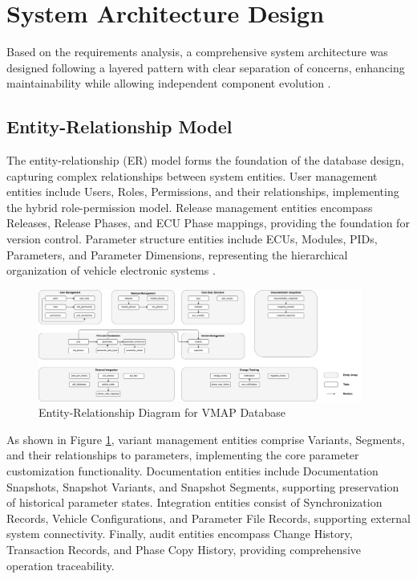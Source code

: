 \section{System Architecture Design}
\label{sec:system-architecture-design}

Based on the requirements analysis, a comprehensive system architecture was designed following a layered pattern with clear separation of concerns, enhancing maintainability while allowing independent component evolution \cite{fowler2003patterns}.

\subsection{Entity-Relationship Model}
\label{subsec:entity-relationship-model}

The entity-relationship (ER) model forms the foundation of the database design, capturing complex relationships between system entities. User management entities include Users, Roles, Permissions, and their relationships, implementing the hybrid role-permission model. Release management entities encompass Releases, Release Phases, and ECU Phase mappings, providing the foundation for version control. Parameter structure entities include ECUs, Modules, PIDs, Parameters, and Parameter Dimensions, representing the hierarchical organization of vehicle electronic systems \cite{staron2021automotive}.

\begin{figure}[htbp]
    \centering
    \includegraphics[width=0.95\textwidth]{figures/vmap_er_diagram.png}
    \caption{Entity-Relationship Diagram for VMAP Database}
    \label{fig:er-diagram}
\end{figure}

As shown in Figure \ref{fig:er-diagram}, variant management entities comprise Variants, Segments, and their relationships to parameters, implementing the core parameter customization functionality. Documentation entities include Documentation Snapshots, Snapshot Variants, and Snapshot Segments, supporting preservation of historical parameter states. Integration entities consist of Synchronization Records, Vehicle Configurations, and Parameter File Records, supporting external system connectivity. Finally, audit entities encompass Change History, Transaction Records, and Phase Copy History, providing comprehensive operation traceability.

